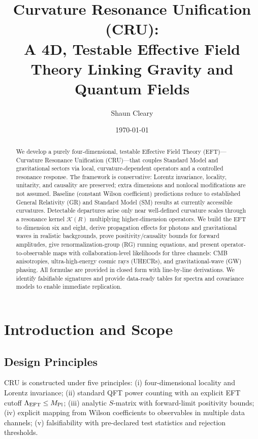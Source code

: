 \documentclass[12pt,a4paper,oneside]{scrbook}
\title{Curvature Resonance Unification (CRU):\\
A 4D, Testable Effective Field Theory Linking Gravity and Quantum Fields}
\author{Shaun Cleary}
\date{\today}
\theoremstyle{definition}
\theoremstyle{remark}
\newcommand{\mpl}{M_{\mathrm{Pl}}}
\newcommand{\K}{\mathcal{K}}
\begin{document}
\maketitle
{}
\begin{abstract}
We develop a purely four-dimensional, testable Effective Field Theory (EFT)---Curvature Resonance Unification (CRU)---that couples Standard Model and gravitational sectors via local, curvature-dependent operators and a controlled resonance response. The framework is conservative: Lorentz invariance, locality, unitarity, and causality are preserved; extra dimensions and nonlocal modifications are not assumed. Baseline (constant Wilson coefficient) predictions reduce to established General Relativity (GR) and Standard Model (SM) results at currently accessible curvatures. Detectable departures arise only near well-defined curvature scales through a resonance kernel $\K(R)$ multiplying higher-dimension operators. We build the EFT to dimension six and eight, derive propagation effects for photons and gravitational waves in realistic backgrounds, prove positivity/causality bounds for forward amplitudes, give renormalization-group (RG) running equations, and present operator-to-observable maps with collaboration-level likelihoods for three channels: CMB anisotropies, ultra-high-energy cosmic rays (UHECRs), and gravitational-wave (GW) phasing. All formulae are provided in closed form with line-by-line derivations. We identify falsifiable signatures and provide data-ready tables for spectra and covariance models to enable immediate replication.
\end{abstract}
\tableofcontents
\listoffigures
\listoftables
\cleardoublepage
{}
\chapter{Introduction and Scope}
\section{Design Principles}
\label{sec:design-principles}
CRU is constructed under five principles: (i) four-dimensional locality and Lorentz invariance; (ii) standard QFT power counting with an explicit EFT cutoff $\Lambda_{\rm EFT}\le \mpl$; (iii) analytic $S$-matrix with forward-limit positivity bounds; (iv) explicit mapping from Wilson coefficients to observables in multiple data channels; (v) falsifiability with pre-declared test statistics and rejection thresholds.
\end{document}
